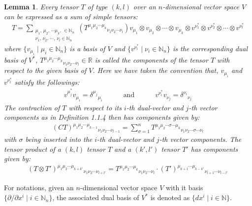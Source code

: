 \documentclass[11pt, onesided]{book}
\theoremstyle{break}
\theoremstyle{break}
\newtheorem{lem}{Lemma}[thm]
\newcommand{\R}{\mathbb{R}}
\newcommand{\N}{\mathbb{N}}
\newcommand{\pd}{\partial}
\begin{document}
\begin{lem}
Every tensor $T$ of type $(k,l)$ over an $n$-dimensional vector space $V$ can be expressed as a sum of simple tensors:
\begin{align*}
T = \sum_{\substack{\mu_1 ,\,\mu_2,\,\cdots \mu_k,\, \in \N_n\\ \nu_1,\, \nu_2,\,\cdots,\,\nu_l \in \N_n}}(T^{\mu_1 \mu_2\cdots \mu_k}{}_{\nu_1\nu_2\cdots\nu_l})v_{\mu_1}\otimes v_{\mu_2}\otimes \cdots \otimes v_{\mu_k}\otimes v^{\nu_1^*}\otimes v^{\nu_2^*}\otimes \cdots \otimes v^{\nu_l^*}
\end{align*}
where $\{v_{\mu_i}\mid \mu_i \in \N_n\}$ is a basis of $V$ and $\{v^{\nu_i^*}\mid \nu_i \in \N_n\}$ is the corresponding dual basis of $V^*$, $T^{\mu_1 \mu_2\cdots \mu_k}{}_{\nu_1\nu_2\cdots\nu_l}\in \R$ is called the components of the tensor $T$ with respect to the given basis of $V$. Here we have taken the convention that, $v_{\mu_i}$ and $v^{\nu_i^*}$ satisfy the followings:
\begin{align*}
v^{\mu_j^*}v_{\mu_i} = \delta^{\mu_j}{}_{\mu_i} \qquad\quad\text{and}\quad\qquad v^{\nu_i^*}v_{\nu_j} =\delta^{\nu_i}{}_{\nu_j}
\end{align*}
The contraction of $T$ with respect to its $i$-th dual-vector and $j$-th vector components as in Definition 1.1.4 then has components given by:
\begin{align*}
(CT)^{\mu_1  \mu_2 \cdots  \mu_{k-1}}{}_{\nu_1\nu_2\cdots\nu_{l-1}} = \sum_{\sigma=1}^n T^{\mu_1  \mu_2\cdots\sigma \cdots \mu_k}{}_{\nu_1\nu_2\cdots\sigma\cdots\nu_l}
\end{align*}
with $\sigma$ being inserted into the $i$-th dual-vector and $j$-th vector components. The tensor product of a $(k,l)$ tensor $T$ and a $(k', l')$ tensor $T'$ has components given by:
\begin{align*}
(T\otimes T')^{\mu_1 \mu_2\cdots \mu_{k+k'}}{}_{\nu_1\nu_2\cdots\nu_{l+l'}} = T^{\mu_1 \mu_2\cdots \mu_{k}}{}_{\nu_1\nu_2\cdots\nu_{l}}  \cdot (T')^{\mu_{k+1}\cdots \mu_{k-k'}}{}_{\nu_{l+1}\cdots\nu_{l-l'}} 
\end{align*}
\end{lem} 


For notations, given an $n$-dimensional vector space $V$ with it basis $\{\pd/\pd x^i \mid i\in \N_n\}$, the associated dual basis of $V^*$ is denoted as $\{dx^i \mid i \in \N\}$. \\
\end{document}
